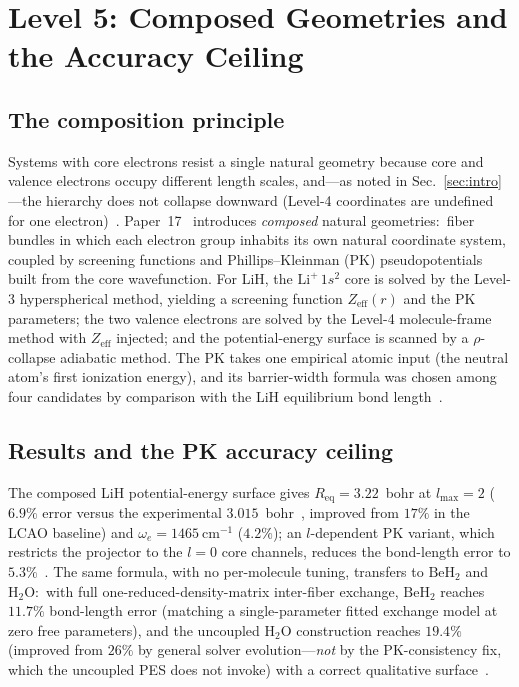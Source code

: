\documentclass[aps,pra,twocolumn,superscriptaddress,longbibliography]{revtex4-2}
\begin{document}
\section{Level 5: Composed Geometries and the Accuracy Ceiling}
\label{sec:composed}

\subsection{The composition principle}

Systems with core electrons resist a single natural geometry because
core and valence electrons occupy different length scales, and---as
noted in Sec.~\ref{sec:intro}---the hierarchy does not collapse
downward (Level-4 coordinates are undefined for one
electron)~\cite{loutey_paper17}.  Paper~17~\cite{loutey_paper17}
introduces \emph{composed} natural geometries:\ fiber bundles in which
each electron group inhabits its own natural coordinate system, coupled
by screening functions and Phillips--Kleinman (PK)
pseudopotentials~\cite{phillips_kleinman1959} built from the core wavefunction.  For LiH,
the $\mathrm{Li}^+\,1s^2$ core is solved by the Level-3 hyperspherical
method, yielding a screening function $Z_{\mathrm{eff}}(r)$ and the PK
parameters; the two valence electrons are solved by the Level-4
molecule-frame method with $Z_{\mathrm{eff}}$ injected; and the
potential-energy surface is scanned by a $\rho$-collapse adiabatic
method.  The PK takes one empirical atomic input (the neutral atom's
first ionization energy), and its barrier-width formula was chosen among
four candidates by comparison with the LiH equilibrium bond
length~\cite{loutey_paper17}.

\subsection{Results and the PK accuracy ceiling}

The composed LiH potential-energy surface gives $R_{\mathrm{eq}} =
3.22$~bohr at $l_{\max}=2$ ($6.9\%$ error versus the experimental
$3.015$~bohr~\cite{huber1979}, improved from $17\%$ in the LCAO baseline) and
$\omega_e = 1465~\mathrm{cm}^{-1}$ ($4.2\%$); an $l$-dependent PK
variant, which restricts the projector to the $l=0$ core channels,
reduces the bond-length error to $5.3\%$~\cite{loutey_paper17}.  The
same formula, with no per-molecule tuning, transfers to $\mathrm{BeH}_2$ and
$\mathrm{H}_2\mathrm{O}$:\ with full one-reduced-density-matrix
inter-fiber exchange, $\mathrm{BeH}_2$ reaches $11.7\%$
bond-length error (matching a single-parameter fitted exchange model at
zero free parameters), and the uncoupled $\mathrm{H}_2\mathrm{O}$
construction reaches $19.4\%$ (improved from $26\%$ by general solver evolution---\emph{not}
by the PK-consistency fix, which the uncoupled PES does not invoke) with a correct qualitative
surface~\cite{loutey_paper17}.
\end{document}
